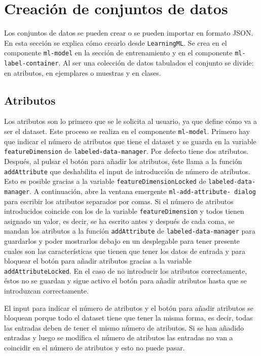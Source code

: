\documentclass[a4paper, 12pt]{book}
\begin{document}
\section{Creación de conjuntos de datos} 
\label{sec:crear conjunto de datos}

Los conjuntos de datos se pueden crear o se pueden importar en formato JSON. En esta sección se explica cómo crearlo desde \texttt{LearningML}. 
Se crea en el componente \texttt{ml-model} en la sección de entrenamiento y en el componente \texttt{ml-label-container}. 
Al ser una colección de datos tabulados el conjunto se divide: en atributos, en ejemplares o muestras y en clases. 

\subsection{Atributos}
\label{subsec:atributos}

Los atributos son lo primero que se le solicita al usuario, ya que define cómo va a ser el dataset. 
Este proceso se realiza en el componente \texttt{ml-model}. 
Primero hay que indicar el número de atributos que tiene el dataset y se guarda en la variable \texttt{featureDimension} de \texttt{labeled-data-manager}. Por defecto tiene dos atributos. 
Después, al pulsar el botón para añadir los atributos, éste llama a la función \texttt{addAttribute} que deshabilita el input de introducción de número de atributos. Esto es posible gracias a la variable \texttt{featureDimensionLocked} de \texttt{labeled-data-manager}.
A continuación, abre la ventana emergente \texttt{ml-add-attribute-
dialog} para escribir los atributos separados por comas. 
Si el número de atributos introducidos coincide con los de la variable \texttt{featureDimension} y todos tienen asignado un valor, es decir, se ha escrito antes y después de cada coma, se mandan los atributos a la función \texttt{addAttribute} de \texttt{labeled-data-manager} para guardarlos y poder mostrarlos debajo en un desplegable para tener presente cuales son las características que tienen que tener los datos de entrada y para bloquear el botón para añadir atributos gracias a la variable \texttt{addAttributeLocked}. 
En el caso de no introducir los atributos correctamente, éstos no se guardan y sigue activo el botón para añadir atributos hasta que se introduzcan correctamente.

El input para indicar el número de atributos y el botón para añadir atributos se bloquean porque todo el dataset tiene que tener la misma forma, es decir, todas las entradas deben de tener el mismo número de atributos. Si se han añadido entradas y luego se modifica el número de atributos las entradas no van a coincidir en el número de atributos y esto no puede pasar.
\end{document}
